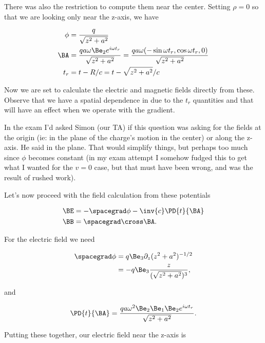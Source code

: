 There was also the restriction to compute them near the center.  Setting $\rho = 0$ so that we are looking only near the z-axis, we have

\begin{align}\label{eqn:relativisticElectrodynamicsExamReflection:n}
\phi &= \frac{q}{\sqrt{z^2 + a^2}} \\
\BA 
&= 
\frac{q a \omega \Be_2 e^{i \omega t_r} }{\sqrt{z^2 + a^2}} 
= 
\frac{q a \omega (-\sin \omega t_r, \cos\omega t_r, 0)}{\sqrt{z^2 + a^2}} \\
t_r &= t - R/c = t - \sqrt{z^2 + a^2}/c
\end{align}

Now we are set to calculate the electric and magnetic fields directly from these.  Observe that we have a spatial dependence in due to the $t_r$ quantities and that will have an effect when we operate with the gradient.  

In the exam I'd asked Simon (our TA) if this question was asking for the fields at the origin (ie: in the plane of the charge's motion in the center) or along the z-axis.  He said in the plane.  That would simplify things, but perhaps too much since $\phi$ becomes constant (in my exam attempt I somehow fudged this to get what I wanted for the $v = 0$ case, but that must have been wrong, and was the result of rushed work).

Let's now proceed with the field calculation from these potentials

\begin{align}\label{eqn:relativisticElectrodynamicsExamReflection:n}
\BE &= - \spacegrad \phi - \inv{c} \PD{t}{\BA} \\
\BB &= \spacegrad \cross \BA.
\end{align}

For the electric field we need

\begin{align*}
\spacegrad \phi 
&= q \Be_3 \partial_z (z^2 + a^2)^{-1/2} \\
&= -q \Be_3 \frac{z}{(\sqrt{z^2 + a^2})^3},
\end{align*}

and

\begin{equation}\label{eqn:relativisticElectrodynamicsExamReflection:n}
\PD{t}{\BA} =
\frac{q a \omega^2 \Be_2 \Be_1 \Be_2 e^{i \omega t_r} }{\sqrt{z^2 + a^2}}.
\end{equation}

Putting these together, our electric field near the z-axis is

